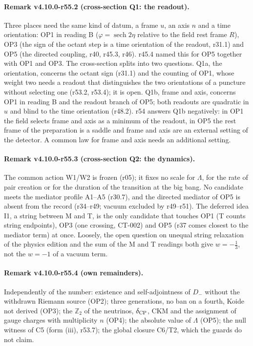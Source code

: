 \paragraph{Remark v4.10.0-r55.2 (cross-section Q1: the readout).}
Three places need the same kind of datum, a frame \(u\), an axis \(n\) and a time orientation: OP1 in reading B (\(\varphi=\operatorname{sech}2\eta\) relative to the field rest
frame \(R\)), OP3 (the sign of the octant step is a time orientation of the readout, r31.1) and OP5 (the directed coupling, r40, r45.3, r46).  r45.4 named
this for OP5 together with OP1 and OP3.  The cross-section splits into two questions.  Q1a, the orientation, concerns the octant sign (r31.1) and
the counting of OP1, whose weight two needs a readout that distinguishes the two orientations of a puncture without selecting one (r53.2, r53.4);
it is open.  Q1b, frame and axis, concerns OP1 in reading B and the readout branch of OP5; both readouts are quadratic in \(u\) and blind to the time
orientation (r48.2).  r54 answers Q1b negatively: in OP1 the field selects frame and axis as a minimum of the readout, in OP5 the rest frame of the
preparation is a saddle and frame and axis are an external setting of the detector.  A common law for frame and axis needs an additional setting.

\paragraph{Remark v4.10.0-r55.3 (cross-section Q2: the dynamics).}
The common action W1/W2 is frozen (r05); it fixes no scale for \(\Lambda\), for the rate of pair creation or for the duration of the transition at the big bang.
No candidate meets the mediator profile A1--A5 (r30.7), and the directed mediator of OP5 is absent from the record (r34--r49; vacuum excluded by
r49--r51).  The deferred idea I1, a string between M and T, is the only candidate that touches OP1 (T counts string endpoints), OP3 (one crossing,
CT-002) and OP5 (r37 comes closest to the mediator term) at once.  Loosely, the open question on unequal string relaxation of the physics edition and
the sum of the M and T readings both give \(w=-\tfrac13\), not the \(w=-1\) of a vacuum term.

\paragraph{Remark v4.10.0-r55.4 (own remainders).}
Independently of the number: existence and self-adjointness of \(D_-\) without the withdrawn Riemann source (OP2); three generations, no ban on a
fourth, Koide not derived (OP3); the \(\mathbb Z_2\) of the neutrinos, \(\delta_{\rm CP}\), CKM and the assignment of gauge charges with multiplicity \(n\) (OP4); the absolute value
of \(\Lambda\) (OP5); the null witness of C5 (form (iii), r53.7); the global closure C6/T2, which the guards do not claim.

